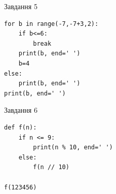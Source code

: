 \documentclass[12pt, ukrainian]{article}
\begin{document}
{\vspace{15mm}
\begin{minipage}[t]{9.7cm}                
{\begin{center}Завдання {5}\end{center}}
\begin{verbatim}
for b in range(-7,-7+3,2):
    if b<=6:
        break
    print(b, end=' ')
    b=4
else:
    print(b, end=' ')
print(b, end=' ')
\end{verbatim}     
\end{minipage}
\vline \hspace{8mm}
\begin{minipage}[t]{8.0cm}                
{\begin{center}Завдання {6}\end{center}}
\begin{verbatim}
def f(n):
    if n <= 9:
        print(n % 10, end=' ')
    else:
        f(n // 10)

f(123456)
\end{verbatim}     
\end{minipage}

}
\newpage
\end{document}
